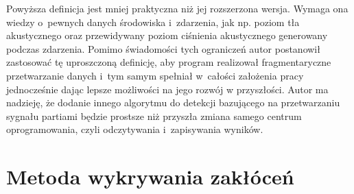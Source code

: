 \documentclass[eng,printmode]{mgr}
\begin{document}
Powyższa definicja jest mniej praktyczna niż jej rozszerzona wersja. Wymaga ona wiedzy o~pewnych danych środowiska i~zdarzenia, jak np. poziom tła akustycznego oraz przewidywany poziom ciśnienia akustycznego generowany podczas zdarzenia. Pomimo świadomości tych ograniczeń autor postanowił zastosować tę uproszczoną definicję, aby program realizował fragmentaryczne przetwarzanie danych i~tym samym spełniał w~całości założenia pracy jednocześnie dając lepsze możliwości na jego rozwój w przyszłości. Autor ma nadzieję, że dodanie innego algorytmu do detekcji bazującego na przetwarzaniu sygnału partiami będzie prostsze niż przyszła zmiana samego centrum oprogramowania, czyli odczytywania i~zapisywania wyników. 

\section{Metoda wykrywania zakłóceń}
\end{document}
